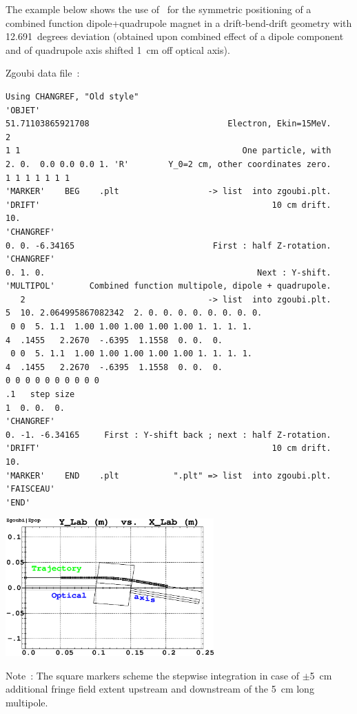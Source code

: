 \medskip


\noindent The example below shows the use of  \CHANGREF\ for the symmetric positioning of 
a combined function dipole+quadrupole  magnet in a drift-bend-drift geometry with 
12.691~degrees deviation (obtained upon combined effect of  a dipole component and 
of quadrupole axis shifted 1~cm off optical axis). 

\medskip

\begin{center}
\begin{minipage}{.38\linewidth}

 Zgoubi data file~: 

\tiny
\begin{verbatim}
Using CHANGREF, "Old style"
'OBJET'
51.71103865921708                            Electron, Ekin=15MeV.
2
1 1                                             One particle, with
2. 0.  0.0 0.0 0.0 1. 'R'        Y_0=2 cm, other coordinates zero.
1 1 1 1 1 1 1 
'MARKER'    BEG    .plt                  -> list  into zgoubi.plt.
'DRIFT'                                               10 cm drift.
10.
'CHANGREF'  
0. 0. -6.34165                            First : half Z-rotation.
'CHANGREF'  
0. 1. 0.                                           Next : Y-shift.
'MULTIPOL'       Combined function multipole, dipole + quadrupole.
   2                                     -> list  into zgoubi.plt.
5  10. 2.064995867082342  2. 0. 0. 0. 0. 0. 0. 0. 0.
 0 0  5. 1.1  1.00 1.00 1.00 1.00 1.00 1. 1. 1. 1.                              
4  .1455   2.2670  -.6395  1.1558  0. 0.  0.                                    
 0 0  5. 1.1  1.00 1.00 1.00 1.00 1.00 1. 1. 1. 1.                              
4  .1455   2.2670  -.6395  1.1558  0. 0.  0.                                    
0 0 0 0 0 0 0 0 0 0
.1   step size
1  0. 0.  0.
'CHANGREF'
0. -1. -6.34165     First : Y-shift back ; next : half Z-rotation.
'DRIFT'                                               10 cm drift.
10.
'MARKER'    END    .plt           ".plt" => list  into zgoubi.plt.
'FAISCEAU'
'END'
\end{verbatim}
\normalsize
\end{minipage}\hspace{.05\linewidth}
\begin{minipage}{.5\linewidth}
\centerline{\includegraphics*[bbllx=20,bblly=100,bburx=567,bbury=470,width=8cm]{FigCHAREFb.eps}}

Note~: The square markers scheme the stepwise integration in case of $\pm$5~cm additional fringe field 
extent upstream and downstream of the 5~cm long multipole. 
\end{minipage}
\end{center}



